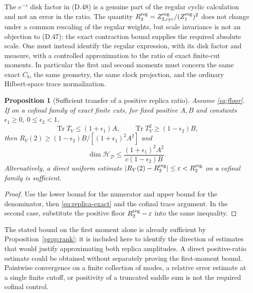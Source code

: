 \documentclass[11pt]{article}
\newcommand{\Tr}{\operatorname{Tr}}
\newcommand{\HH}{\mathcal H_{\mathcal D}}
\newtheorem{prop}{Proposition}
\begin{document}
The $e^{-s}$ disk factor in (D.48) is a genuine part of the regular cyclic calculation and not an error in the ratio. The quantity $R_2^{\rm reg}=Z_{2,\mathrm{cyc}}^{\rm reg}/(Z_1^{\rm reg})^2$ does not change under a common rescaling of the regular weights, but scale invariance is not an objection to (D.47): the exact contraction bound supplies the required absolute scale. One must instead identify the regular expression, with its disk factor and measure, with a controlled approximation to the ratio of exact finite-cut moments. In particular the first and second moments must concern the same exact $C_b$, the same geometry, the same clock projection, and the ordinary Hilbert-space trace normalization.

\begin{prop}[Sufficient transfer of a positive replica ratio]\label{prop:replica-transfer}
Assume \eqref{eq:floor}. If on a cofinal family of exact finite cuts, for fixed positive $A,B$ and constants $\epsilon_1\ge0$, $0\le\epsilon_2<1$,
\[
 \Tr T_V\le (1+\epsilon_1)A,\qquad \Tr T_V^2\ge(1-\epsilon_2)B,
\]
then $R_V(2)\ge (1-\epsilon_2)B/[(1+\epsilon_1)^2A^2]$ and
\[
 \dim\HH\le \frac{(1+\epsilon_1)^2A^2}{c(1-\epsilon_2)B}.
\]
Alternatively, a direct uniform estimate $|R_V(2)-R_2^{\rm reg}|\le\varepsilon<R_2^{\rm reg}$ on a cofinal family is sufficient.
\end{prop}
\begin{proof}
Use the lower bound for the numerator and upper bound for the denominator, then \eqref{eq:replica-exact} and the cofinal trace argument. In the second case, substitute the positive floor $R_2^{\rm reg}-\varepsilon$ into the same inequality.
\end{proof}
The stated bound on the first moment alone is already sufficient by Proposition~\ref{prop:rank}; it is included here to identify the direction of estimates that would justify approximating both replica amplitudes. A direct positive-ratio estimate could be obtained without separately proving the first-moment bound. Pointwise convergence on a finite collection of modes, a relative error estimate at a single finite cutoff, or positivity of a truncated saddle sum is not the required cofinal control.
\end{document}
